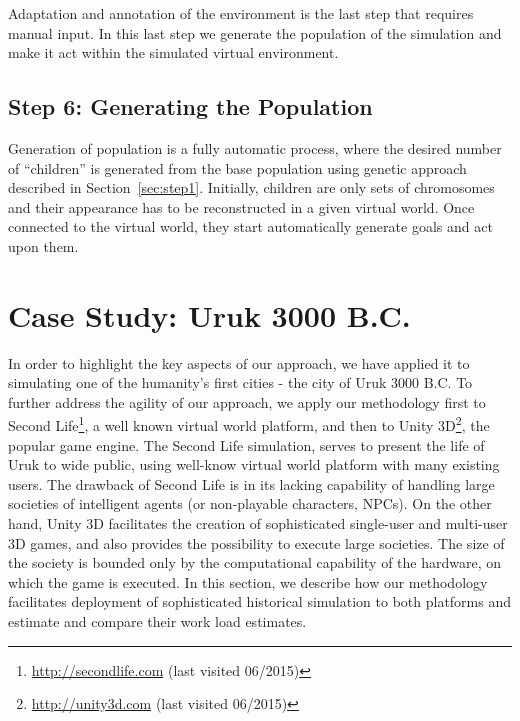 \documentclass[graybox]{svmult}
\begin{document}
Adaptation and annotation of the environment is the last step that requires manual input. In this last step we generate the population of the simulation and make it act within the simulated virtual environment.  



\subsection{Step 6: Generating the Population}

\label{sec:generation}

Generation of population is a fully automatic process, where the desired number of ``children'' is generated from the base population using genetic approach described in Section~\ref{sec:step1}. Initially, children are only sets of chromosomes and their appearance has to be reconstructed in a given virtual world. Once connected to the virtual world, they start automatically generate goals and act upon them.



\section{Case Study: Uruk 3000 B.C.}
\label{sec:CaseStudy}


In order to highlight the key aspects of our approach, we have applied it to simulating one of the humanity's first cities - the city of Uruk 3000 B.C. To further address the agility of our approach, we apply our methodology first to Second Life\footnote{\url{http://secondlife.com} (last visited 06/2015)}, a well known virtual world platform, and then to Unity 3D\footnote{\url{http://unity3d.com} (last visited 06/2015)}, the popular game engine. The Second Life simulation, serves to present the life of Uruk to wide public, using well-know virtual world platform with many existing users. The drawback of Second Life is in its lacking capability of handling large societies of intelligent agents (or non-playable characters, NPCs). On the other hand, Unity 3D facilitates the creation of sophisticated single-user and multi-user 3D games, and also provides the possibility to execute large societies. The size of the society is bounded only by the computational capability of the hardware, on which the game is executed. In this section, we describe how our methodology facilitates deployment of sophisticated historical simulation to both platforms and estimate and compare their work load estimates.  
\end{document}
